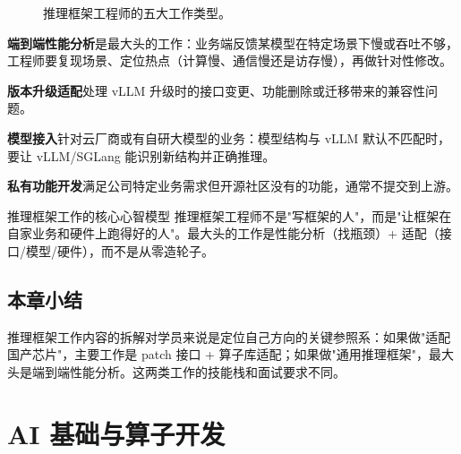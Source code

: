 \documentclass[a4paper]{article}
\begin{document}
\begin{figure}[H]
\centering
{}
\caption{推理框架工程师的五大工作类型。}
\end{figure}

\textbf{端到端性能分析}是最大头的工作：业务端反馈某模型在特定场景下慢或吞吐不够，工程师要复现场景、定位热点（计算慢、通信慢还是访存慢），再做针对性修改。

\textbf{版本升级适配}处理 vLLM 升级时的接口变更、功能删除或迁移带来的兼容性问题。

\textbf{模型接入}针对云厂商或有自研大模型的业务：模型结构与 vLLM 默认不匹配时，要让 vLLM/SGLang 能识别新结构并正确推理。

\textbf{私有功能开发}满足公司特定业务需求但开源社区没有的功能，通常不提交到上游。

\begin{importantbox}{推理框架工作的核心心智模型}
推理框架工程师不是"写框架的人"，而是"让框架在自家业务和硬件上跑得好的人"。最大头的工作是性能分析（找瓶颈）+ 适配（接口/模型/硬件），而不是从零造轮子。
\end{importantbox}

\subsection{本章小结}

推理框架工作内容的拆解对学员来说是定位自己方向的关键参照系：如果做"适配国产芯片"，主要工作是 patch 接口 + 算子库适配；如果做"通用推理框架"，最大头是端到端性能分析。这两类工作的技能栈和面试要求不同。

\section{AI 基础与算子开发}
\end{document}
